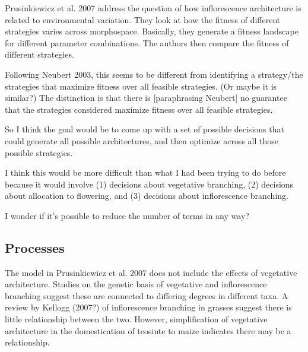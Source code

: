 \documentclass[12pt, oneside]{article}   	%
\begin{document}
 

Prusinkiewicz et al. 2007 address the question of how inflorescence architecture is related to environmental variation. They look at how the fitness of different strategies varies across morphospace. Basically, they generate a fitness landscape for different parameter combinations. The authors then compare the fitness of different strategies. 

Following Neubert 2003, this seems to be different from identifying a strategy/the strategies that maximize fitness over all feasible strategies. (Or maybe it is similar?) The distinction is that there is [paraphrasing Neubert] no guarantee that the strategies considered maximize fitness over all feasible strategies. 

So I think the goal would be to come up with a set of possible decisions that could generate all possible architectures, and then optimize across all those possible strategies. 

I think this would be more difficult than what I had been trying to do before because it would involve (1) decisions about vegetative branching, (2) decisions about allocation to flowering, and (3) decisions about inflorescence branching. 

I wonder if it's possible to reduce the number of terms in any way?

\subsection*{Processes}

The model in Prusinkiewicz et al. 2007 does not include the effects of vegetative architecture. Studies on the genetic basis of vegetative and inflorescence branching suggest these are connected to differing degrees in different taxa. A review by Kellogg (2007?) of inflorescence branching in grasses suggest there is little relationship between the two. However, simplification of vegetative architecture in the domestication of teosinte to maize indicates there may be a relationship. 
\end{document}
